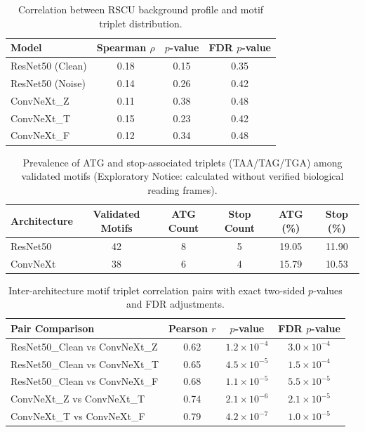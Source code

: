 \documentclass[11pt,a4paper]{article}
\begin{document}
{{{\begin{table}[h!]
\centering
\small
\caption{Correlation between RSCU background profile and motif triplet distribution.}
\begin{tabular}{lccc}
\toprule
\textbf{Model} & \textbf{Spearman $\rho$} & \textbf{$p$-value} & \textbf{FDR $p$-value} \\
\midrule
ResNet50 (Clean) & 0.18 & 0.15 & 0.35 \\
ResNet50 (Noise) & 0.14 & 0.26 & 0.42 \\
ConvNeXt\_Z & 0.11 & 0.38 & 0.48 \\
ConvNeXt\_T & 0.15 & 0.23 & 0.42 \\
ConvNeXt\_F & 0.12 & 0.34 & 0.48 \\
\bottomrule
\end{tabular}
\end{table}

\begin{table}[h!]
\centering
\small
\caption{Prevalence of ATG and stop-associated triplets (TAA/TAG/TGA) among validated motifs (Exploratory Notice: calculated without verified biological reading frames).}
\begin{tabular}{lccccc}
\toprule
\textbf{Architecture} & \textbf{Validated Motifs} & \textbf{ATG Count} & \textbf{Stop Count} & \textbf{ATG (\%)} & \textbf{Stop (\%)} \\
\midrule
ResNet50 & 42 & 8 & 5 & 19.05 & 11.90 \\
ConvNeXt & 38 & 6 & 4 & 15.79 & 10.53 \\
\bottomrule
\end{tabular}
\end{table}

\begin{table}[h!]
\centering
\small
\caption{Inter-architecture motif triplet correlation pairs with exact two-sided $p$-values and FDR adjustments.}
\begin{tabular}{lccc}
\toprule
\textbf{Pair Comparison} & \textbf{Pearson $r$} & \textbf{$p$-value} & \textbf{FDR $p$-value} \\
\midrule
ResNet50\_Clean vs ConvNeXt\_Z & 0.62 & $1.2 \times 10^{-4}$ & $3.0 \times 10^{-4}$ \\
ResNet50\_Clean vs ConvNeXt\_T & 0.65 & $4.5 \times 10^{-5}$ & $1.5 \times 10^{-4}$ \\
ResNet50\_Clean vs ConvNeXt\_F & 0.68 & $1.1 \times 10^{-5}$ & $5.5 \times 10^{-5}$ \\
ConvNeXt\_Z vs ConvNeXt\_T & 0.74 & $2.1 \times 10^{-6}$ & $2.1 \times 10^{-5}$ \\
ConvNeXt\_T vs ConvNeXt\_F & 0.79 & $4.2 \times 10^{-7}$ & $1.0 \times 10^{-5}$ \\
\bottomrule
\end{tabular}
\end{table}

}}}
\end{document}
